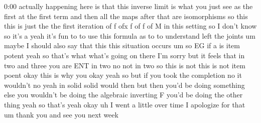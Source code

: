 \begin{unfinished}{0:00}
actually  happening  here  is  that  this
inverse  limit  is  what  you  just  see  as
the  first  at  the  first  term  and  then  all
the  maps  after  that  are  isomorphisms  so
this  this  is  just  the  the  first
iteration  of  f  ofx  f  of  f  of  M  in  this
setting  so  I  don't  know  so  it's  a  yeah
it's  fun  to  to  use  this  formula  as  to  to
understand  left  the
joints
um  maybe  I  should  also  say  that  this
this  situation
occurs
um  so  EG  if  a  is  item
potent  yeah  so  that's  what  what's  going
on  there  I'm  sorry  but  it  feels  that  in
two  and  three  you  are  ENT  in  two  no  not
in  two
so  this  is  not  this  is  not  item  poent
okay  this  is  why  you  okay  yeah  so  but  if
you  took  the  completion  no  it  wouldn't
no  yeah  in  solid  solid  would  then  but
then  you'd  be  doing  something  else  you
wouldn't  be  doing  the  algebraic
inverting  F  you'd  be  doing  the  other
thing  yeah  so  that's  yeah  okay  uh  I  went
a  little  over  time  I  apologize  for  that
um  thank  you  and  see  you  next
week
\end{unfinished}